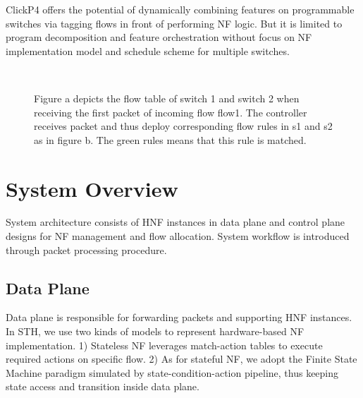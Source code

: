 \documentclass[10pt, conference, letterpaper]{IEEEtran}
\begin{document}
ClickP4 offers the potential of dynamically combining features on programmable switches via tagging flows in front of performing NF logic. But it is limited to program decomposition and feature orchestration without focus on NF implementation model and schedule scheme for multiple switches.


\begin{figure}[t]
\centering  
{}  
\label{1a}\hfill  
{}  
\label{1b}\\
\caption{Figure a depicts the flow table of switch 1 and switch 2 when receiving the first packet of incoming flow flow1. The controller receives packet and thus deploy corresponding flow rules in s1 and s2 as in figure b. The green rules means that this rule is matched.}  
\label{arch}  
\end{figure}

\section{System Overview}
System architecture consists of HNF instances in data plane and control plane designs for NF management and flow allocation. System workflow is introduced through packet processing procedure.

\subsection{Data Plane}\label{AA}
Data plane is responsible for forwarding packets and supporting HNF instances. In STH, we use two kinds of models to represent hardware-based NF implementation. 1) Stateless NF leverages match-action tables to execute required actions on specific flow. 2) As for stateful NF, we adopt the Finite State Machine paradigm simulated by state-condition-action pipeline, thus keeping state access and transition inside data plane. 
\end{document}
